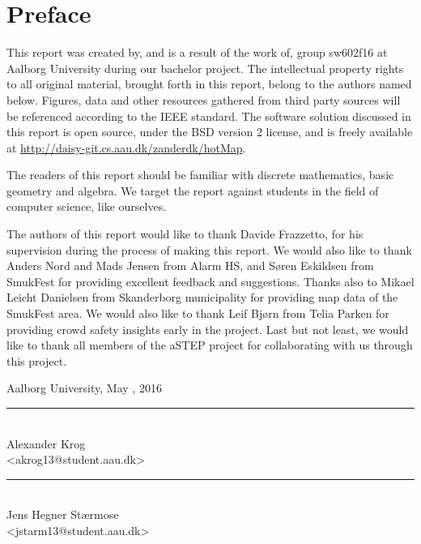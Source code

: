 \chapter*{Preface}\label{ch:preface}
This report was created by, and is a result of the work of, group sw602f16 at Aalborg University during our bachelor project. The intellectual property rights to all original material, brought forth in this report, belong to the authors named below. Figures, data and other resources gathered from third party sources will be referenced according to the IEEE standard. The software solution discussed in this report is open source, under the BSD version 2 license, and is freely available at \url{http://daisy-git.cs.aau.dk/zanderdk/hotMap}.

The readers of this report should be familiar with discrete mathematics, basic geometry and algebra. We target the report against students in the field of computer science, like ourselves.

The authors of this report would like to thank Davide Frazzetto, for his supervision during the process of making this report. We would also like to thank Anders Nord and Mads Jensen from Alarm HS, and Søren Eskildsen from SmukFest for providing excellent feedback and suggestions. Thanks also to Mikael Leicht Danielsen from Skanderborg municipality for providing map data of the SmukFest area. We would also like to thank Leif Bjørn from Telia Parken for providing crowd safety insights early in the project. Last but not least, we would like to thank all members of the aSTEP project for collaborating with us through this project.

\vspace{\baselineskip}\hfill Aalborg University, May , 2016
\vfill

\noindent
\begin{minipage}[b]{0.45\textwidth}
 \centering
 \rule{\textwidth}{0.5pt}\\
  Alexander Krog\\
 {\footnotesize <akrog13@student.aau.dk>}
\end{minipage}
%
\hfill
%
\begin{minipage}[b]{0.45\textwidth}
 \centering
 \rule{\textwidth}{0.5pt}\\
  Jens Hegner Stærmose\\
 {\footnotesize <jstarm13@student.aau.dk>}
\end{minipage}
%
\vspace{3\baselineskip}

